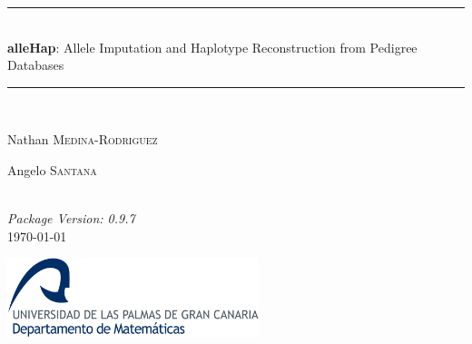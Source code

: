 \begin{titlepage}

\newcommand{\HRule}{\rule{\linewidth}{0.5mm}}

\begin{center}


\HRule \\[1cm]

\LARGE \textbf{alleHap}: Allele Imputation and Haplotype Reconstruction from Pedigree Databases
\\[0.65cm]

\HRule \\[1cm]


\begin{minipage}{0.5\textwidth}
\begin{flushleft} \large
Nathan \textsc{Medina-Rodriguez}
\end{flushleft}
\end{minipage}%
\begin{minipage}{0.4\textwidth}
\begin{flushright} \large
Angelo \textsc{Santana}
\end{flushright}
\end{minipage}\\[1.5cm]


\large \emph{Package Version: 0.9.7}\\[1.2cm]
\small \today

\vfill

\includegraphics[width=0.55\textwidth]{./logo}~\\

\end{center}

\end{titlepage}

